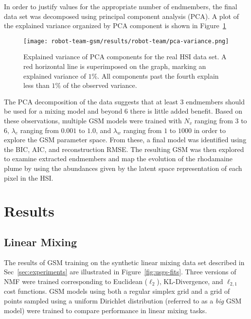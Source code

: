 In order to justify values for the appropriate number of endmembers, the final
data set was decomposed using principal component analysis (PCA). A plot of the
explained variance organized by PCA component is shown in
Figure~\ref{fig:robot-team-pca}

\begin{figure}[!h]
  \centering
  \texttt{[image: robot-team-gsm/results/robot-team/pca-variance.png]}
  \caption{Explained variance of PCA components for the real HSI data set. A red
    horizontal line is superimposed on the graph, marking an explained variance
    of $1\%$. All components past the fourth explain less than $1\%$ of the
    observed variance.}
  \label{fig:robot-team-pca}
\end{figure}

The PCA decomposition of the data suggests that at least $3$ endmembers should
be used for a mixing model and beyond $6$ there is little added benefit. Based
on these observations, multiple GSM models were trained with $N_v$ ranging from
$3$ to $6$, $\lambda_e$ ranging from $0.001$ to $1.0$, and $\lambda_w$ ranging
from $1$ to $1000$ in order to explore the GSM parameter space. From these, a
final model was identified using the BIC, AIC, and reconstruction RMSE. The
resulting GSM was then explored to examine extracted endmembers and map the
evolution of the rhodamaine plume by using the abundances given by the latent
space representation of each pixel in the HSI.



\section{Results}


\subsection{Linear Mixing}

The results of GSM training on the synthetic linear mixing data set described in
Sec~\ref{sec:experiments} are illustrated in Figure~\ref{fig:usgs-fits}. Three
versions of NMF were trained corresponding to Euclidean ($\ell_2$),
KL-Divergence, and $\ell_{2,1}$ cost functions. GSM models using both a regular
simplex grid and a grid of points sampled using a uniform Dirichlet distribution
(referred to as a \textit{big} GSM model) were trained to compare performance in
linear mixing tasks.

\newpage

